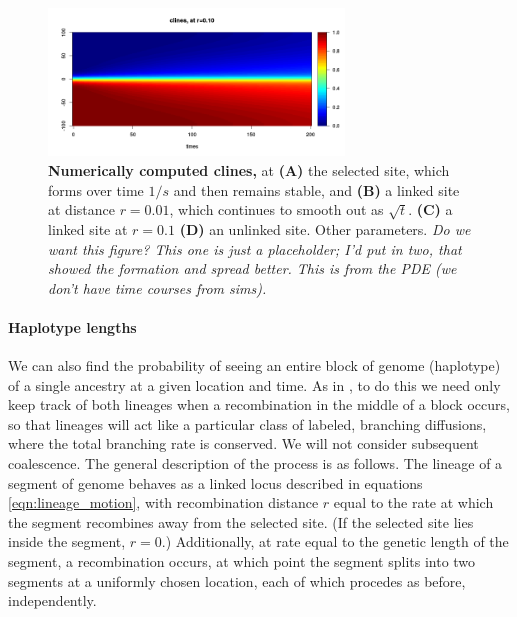 \documentclass[12pt]{article}
\newcommand{\plr}[1]{{\em \color{blue} #1}}
\begin{document}
\begin{figure}
    \begin{center}
       \includegraphics[width=0.7\textwidth]{figs/example_cline}
    \end{center}
    \caption{
        \textbf{Numerically computed clines,} at
        \textbf{(A)} the selected site, which forms over time $1/s$ and then remains stable, and
        \textbf{(B)} a linked site at distance $r=0.01$, which continues to smooth out as $\sqrt{t}$.
        \textbf{(C)} a linked site at $r=0.1$
        \textbf{(D)} an unlinked site.
        Other parameters.
       \plr{Do we want this figure? This one is just a placeholder; I'd put in two, that showed the formation and spread better.
       This is from the PDE (we don't have time courses from sims).}
        \label{fig:pde_clines}
    }
\end{figure}


\paragraph{Haplotype lengths}
We can also find the probability of seeing an entire block of genome (haplotype)
of a single ancestry at a given location and time.
As in \citet{Sedghifar2015},
to do this we need only keep track of both lineages when a recombination in the middle of a block occurs,
so that lineages will act like a particular class of labeled, branching diffusions,
where the total branching rate is conserved.
We will not consider subsequent coalescence.
The general description of the process is as follows.
The lineage of a segment of genome behaves as a linked locus described in equations \eqref{eqn:lineage_motion},
with recombination distance $r$ equal to the rate at which the segment recombines away from the selected site.
(If the selected site lies inside the segment, $r=0$.)
Additionally, at rate equal to the genetic length of the segment,
a recombination occurs, at which point the segment splits into two segments at a uniformly chosen location,
each of which procedes as before, independently.
\end{document}
